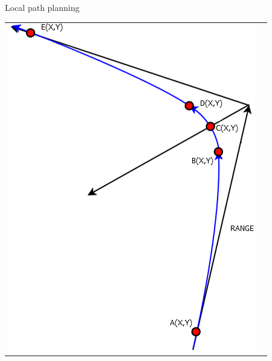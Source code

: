 \begin{frame}{Local path planning}
\begin{tabular}{l l}
\begin{minipage}{0.3\textwidth}
					\includegraphics[width = \textwidth]{control/img/positioning2}
				\end{minipage}
			\end{tabular}
			
		
\end{frame}
